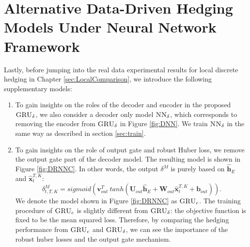 \documentclass[letterpaper,12pt,titlepage,oneside,final]{book}
\numberwithin{equation}{section}
\theoremstyle{definition}
\newcommand{\model}{\textsc{GRU}_\delta}
\newcommand{\modelN}{\textsc{NN}_\delta}
\newcommand{\vb}{\mathbf{b}}
\newcommand{\vx}{\mathbf{x}}
\newcommand{\vv}{\mathbf{v}}
\newcommand{\vW}{\pmb{W}}
\newcommand{\vU}{\pmb{U}}
\begin{document}
\section{Alternative Data-Driven Hedging Models Under Neural Network Framework}
\label{sec:alternativeModel}
Lastly, before jumping into the real data experimental results for local discrete hedging in Chapter \ref{sec:LocalComparison}, we introduce the following supplementary models:
\begin{enumerate}
	\item To gain insights on the roles of the decoder and encoder in the proposed $\model$,  we  also consider a decoder only model $\modelN$, which corresponds to removing the encoder from $\model$ in Figure \ref{fig:DNN}.  We train  $\modelN$ in the same way  as described in section \ref{sec:train}. 
	\item To gain insights on the role of output gate and robust Huber loss, we remove the output gate part of the decoder model. The resulting model  is shown in Figure \ref{fig:DRNNC}. In other words, the output $\delta^M$ is purely based on $\mathbf{\widehat{h}}_E$ and $ \widehat{\vx}_{t}^{T,K}$:
	\[
		{\delta}^M_{t,T,K}=sigmoid (\vv^T_{out} \ tanh( \vU_{out} \mathbf{\widehat{h}}_E + \vW_{out} \widehat{\vx}_{t}^{T,K}+ \vb_{out})).
	\]
	We denote the model shown in Figure \ref{fig:DRNNC} as $\textsc{GRU}_{c}$. The training procedure of $\textsc{GRU}_{c}$ is slightly different from $\model$: the objective function is fixed to be the mean squared loss. Therefore, by comparing the hedging performance from  $\textsc{GRU}_{c}$ and $\model$, we can see the importance of the robust huber losses and the output gate mechanism. 
\end{enumerate}
\end{document}
